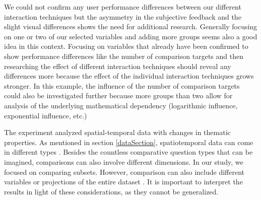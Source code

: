 We could not confirm any user performance differences between our different interaction techniques but the asymmetry in the subjective feedback and the slight visual differences
shows the need for additional research. Generally focusing on one or two of our selected variables and adding more groups seems also a good idea in this context. Focusing on
variables that already have been confirmed to show performance differences like the number of comparison targets and then researching the effect of different interaction
techniques should reveal any differences more because the effect of the individual interaction techniques grows stronger. In this example, the influence of the number
of comparison targets could also be investigated further because more groups than two allow for analysis of the underlying mathematical dependency (logarithmic influence, exponential influence, etc.)

The experiment analyzed spatial-temporal data with changes in thematic properties. As mentioned in section \ref*{dataSection},
spatiotemporal data can come in different types \citep*{Andrienko.2003}. Besides the countless comparative question types that
can be imagined, comparisons can also involve different dimensions. In our study, we focused on comparing subsets. However,
comparison can also include different variables or projections of the entire dataset \citep*{Buja.1996}. It is important to
interpret the results in light of these considerations, as they cannot be generalized.